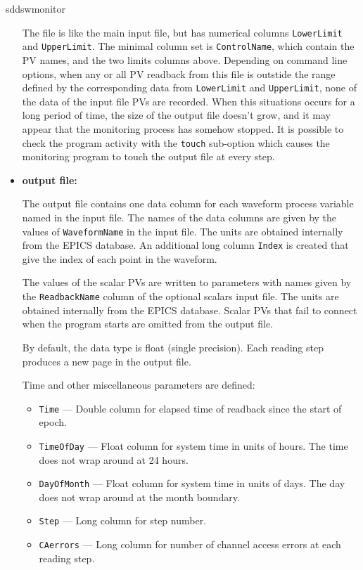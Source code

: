 \begin{sddsprog}{sddswmonitor}
\begin{itemize}
The file is like the main input file, but has numerical columns \verb+LowerLimit+ and \verb+UpperLimit+.
The minimal column set is \verb+ControlName+, which contain the PV names, and the two limits columns above.
Depending on command line options, when any or all PV readback from this file
is outstide the range defined by the corresponding data from \verb+LowerLimit+ and \verb+UpperLimit+,
none of the data of the input file PVs are recorded.
When this situations occurs for a long period of time, the size of the output file doesn't
grow, and it may appear that the monitoring process has somehow stopped.
It is possible to check the program activity with the \verb+touch+ sub-option
which causes the monitoring program to touch the output file at every step.

  \item \textbf{output file:}\par
The output file contains one data column for each waveform process variable named in the input file. The names
of the data columns are given by the values of {\verb+WaveformName+} in the input file. The units are obtained
internally from the EPICS database. An additional long column \verb+Index+ is created that give the index
of each point in the waveform.

The values of the scalar PVs are written to parameters with names given by the {\tt ReadbackName} column
of the optional scalars input file. The units are obtained internally from the EPICS database. Scalar
PVs that fail to connect when the program starts are omitted from the output file.

By default, the data type is float (single precision). Each reading step produces a new page in the output file.

Time and other miscellaneous parameters are defined:
  \begin{itemize}
    \item {\tt Time} --- Double column for elapsed time of readback since the start of epoch.
    \item {\tt TimeOfDay} --- Float column for system time in units of hours. The time does not wrap around at 24 hours.
    \item {\tt DayOfMonth} --- Float column for system time in units of days. The day does not wrap around at the month boundary.
    \item {\tt Step} --- Long column for step number.
    \item {\tt CAerrors} --- Long column for number of channel access errors at each reading step.
  \end{itemize}


\end{itemize}
\end{sddsprog}

